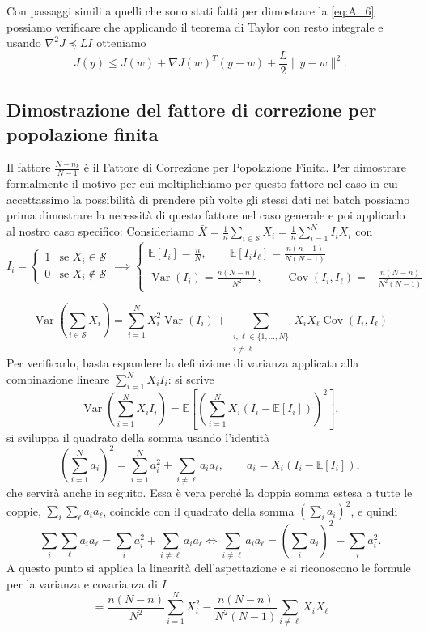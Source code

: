 \documentclass[a4paper,12pt]{article}
\numberwithin{equation}{section}
\numberwithin{figure}{section}
\numberwithin{table}{section}
\begin{document}
Con passaggi simili a quelli che sono stati fatti per dimostrare la \eqref{eq:A_6} possiamo verificare che applicando il teorema di Taylor con resto integrale e usando \(\nabla^2 J \preceq LI\) otteniamo
\[
J(y) \le J(w) + \nabla J(w)^T(y - w) + \frac{L}{2}\|y - w\|^2. \tag{A.12}\label{eq:A_12}
\]

\newpage

\subsection{Dimostrazione del fattore di correzione per \newline popolazione finita}\label{app:corr}

Il fattore $\frac{N-n_k}{N-1}$ \`e il Fattore di Correzione per Popolazione Finita. Per dimostrare formalmente il motivo per cui moltiplichiamo per questo fattore nel caso in cui accettassimo la possibilità di prendere più volte gli stessi dati nei batch possiamo prima dimostrare la necessità di questo fattore nel caso generale e poi applicarlo al nostro caso specifico:
Consideriamo $
\bar{X} = \frac{1}{n}\sum_{i \in \mathcal{S}} X_i = \frac{1}{n}\sum_{i=1}^N I_i X_i
$
con
\[
I_i = 
\begin{cases} 
1 & \text{se } X_i \in \mathcal{S} \\ 
0 & \text{se } X_i \notin \mathcal{S}
\end{cases}
 \implies
\begin{cases}
\mathbb{E}[I_i] = \frac{n}{N}, \qquad \mathbb{E}[I_i I_\ell] = \frac{n(n-1)}{N(N-1)}
\\
\operatorname{Var}(I_i) = \frac{n(N-n)}{N^2}, \qquad 
\operatorname{Cov}(I_i, I_\ell) = -\frac{n(N-n)}{N^2(N-1)}
\end{cases}\]

\[
\operatorname{Var}\left(\sum_{i \in \mathcal{S}} X_i\right) = 
\sum_{i=1}^N X_i^2 \operatorname{Var}(I_i) + \sum_{\substack{i,\ell \in \{1,\dots,N\} \\ i \neq \ell}} X_i X_\ell \operatorname{Cov}(I_i, I_\ell)
\]
Per verificarlo, basta espandere la definizione di varianza applicata alla combinazione lineare $\sum_{i=1}^N X_i I_i$: si scrive
\[
\operatorname{Var}\left(\sum_{i=1}^N X_i I_i\right) = \mathbb{E}\left[\left(\sum_{i=1}^N X_i (I_i - \mathbb{E}[I_i])\right)^2\right],
\]
si sviluppa il quadrato della somma usando l'identità
\[
\left(\sum_{i=1}^N a_i\right)^2 = \sum_{i=1}^N a_i^2 + \sum_{i \neq \ell} a_i a_\ell,
\qquad a_i = X_i (I_i - \mathbb{E}[I_i]),
\]
che servirà anche in seguito. Essa è vera perché la doppia somma estesa a tutte le coppie, $\sum_i \sum_\ell a_i a_\ell$, coincide con il quadrato della somma $\left(\sum_i a_i\right)^2$, e quindi
\[
\sum_i \sum_\ell a_i a_\ell = \sum_i a_i^2 + \sum_{i \neq \ell} a_i a_\ell
\iff \sum_{i \neq \ell} a_i a_\ell = \left(\sum_i a_i\right)^2 - \sum_i a_i^2 .
\]
A questo punto si applica la linearità dell'aspettazione e si riconoscono le formule per la varianza e covarianza di $I$
\[
= \frac{n(N-n)}{N^2} \sum_{i=1}^N X_i^2 - \frac{n(N-n)}{N^2(N-1)} \sum_{i \neq \ell} X_i X_\ell
\]
\end{document}
